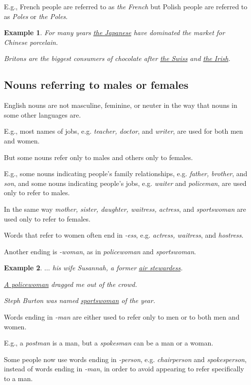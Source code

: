 \documentclass[oneside]{book}
\numberwithin{equation}{section}
\newtheorem{example}{Example}[section]
\begin{document}
E.g., French people are referred to as \textit{the French} but Polish people are referred to as \textit{Poles} or \textit{the Poles}.
\begin{example}
    For many years \underline{the Japanese} have dominated the market for Chinese porcelain.
    
    Britons are the biggest consumers of chocolate after \underline{the Swiss} and \underline{the Irish}.
\end{example}

\subsection{Nouns referring to males or females}
\noindent{} English nouns are not masculine, feminine, or neuter in the way that nouns in some other languages are.

E.g., most names of jobs, e.g. \textit{teacher, doctor}, and \textit{writer}, are used for both men and women.

%
But some nouns refer only to males and others only to females.

%
E.g., some nouns indicating people's family relationships, e.g. \textit{father, brother}, and \textit{son}, and some nouns indicating people's jobs, e.g. \textit{waiter} and \textit{policeman}, are used only to refer to males.

%
In the same way \textit{mother, sister, daughter, waitress, actress}, and \textit{sportswoman} are used only to refer to females.

%
\noindent{} Words that refer to women often end in \textit{-ess}, e.g. \textit{actress, waitress}, and \textit{hostress}.

Another ending is \textit{-woman}, as in \textit{policewoman} and \textit{sportswoman}.
\begin{example}
    $\ldots$ his wife Susannah, a former \underline{air stewardess}.
    
    \underline{A policewoman} dragged me out of the crowd.
    
    Steph Burton was named \underline{sportswoman} of the year.
\end{example}
%
\noindent{} Words ending in \textit{-man} are either used to refer only to men or to both men and women.

E.g., a \textit{postman} is a man, but a \textit{spokesman} can be a man or a woman.

%
Some people now use words ending in \textit{-person}, e.g. \textit{chairperson} and \textit{spokesperson}, instead of words ending in \textit{-man}, in order to avoid appearing to refer specifically to a man.
\end{document}
